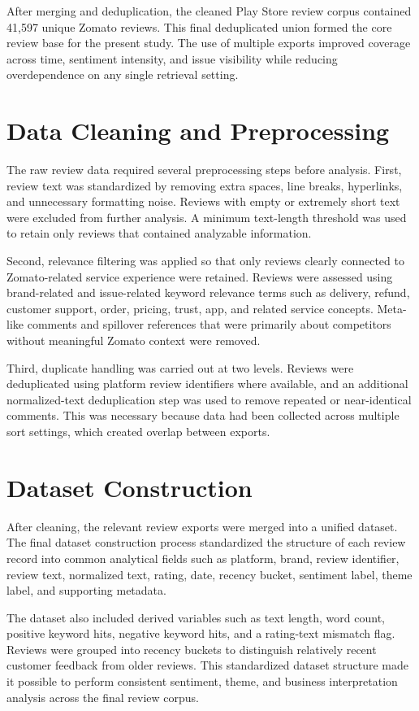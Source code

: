 After merging and deduplication, the cleaned Play Store review corpus contained 41,597 unique Zomato reviews. This final deduplicated union formed the core review base for the present study. The use of multiple exports improved coverage across time, sentiment intensity, and issue visibility while reducing overdependence on any single retrieval setting.

\section{Data Cleaning and Preprocessing}

The raw review data required several preprocessing steps before analysis. First, review text was standardized by removing extra spaces, line breaks, hyperlinks, and unnecessary formatting noise. Reviews with empty or extremely short text were excluded from further analysis. A minimum text-length threshold was used to retain only reviews that contained analyzable information.

Second, relevance filtering was applied so that only reviews clearly connected to Zomato-related service experience were retained. Reviews were assessed using brand-related and issue-related keyword relevance terms such as delivery, refund, customer support, order, pricing, trust, app, and related service concepts. Meta-like comments and spillover references that were primarily about competitors without meaningful Zomato context were removed.

Third, duplicate handling was carried out at two levels. Reviews were deduplicated using platform review identifiers where available, and an additional normalized-text deduplication step was used to remove repeated or near-identical comments. This was necessary because data had been collected across multiple sort settings, which created overlap between exports.

\section{Dataset Construction}

After cleaning, the relevant review exports were merged into a unified dataset. The final dataset construction process standardized the structure of each review record into common analytical fields such as platform, brand, review identifier, review text, normalized text, rating, date, recency bucket, sentiment label, theme label, and supporting metadata.

The dataset also included derived variables such as text length, word count, positive keyword hits, negative keyword hits, and a rating-text mismatch flag. Reviews were grouped into recency buckets to distinguish relatively recent customer feedback from older reviews. This standardized dataset structure made it possible to perform consistent sentiment, theme, and business interpretation analysis across the final review corpus.

